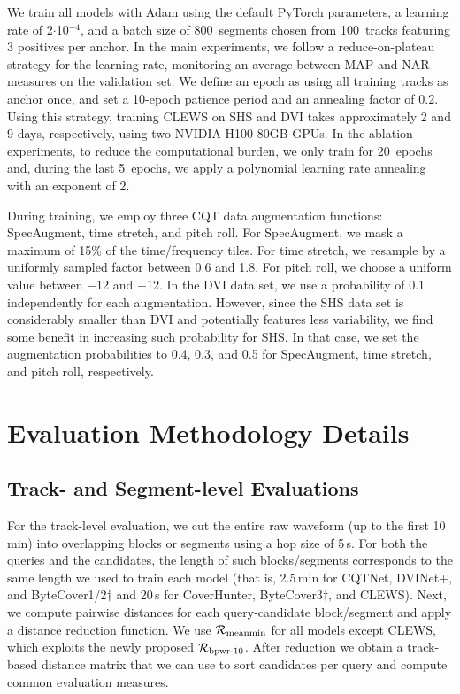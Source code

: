 We train all models with Adam using the default PyTorch parameters, a learning rate of 2$\cdot$10$^{-4}$, and a batch size of 800~segments chosen from 100~tracks featuring 3 positives per anchor. In the main experiments, we follow a reduce-on-plateau strategy for the learning rate, monitoring an average between MAP and NAR measures on the validation set. We define an epoch as using all training tracks as anchor once, and set a 10-epoch patience period and an annealing factor of 0.2. Using this strategy, training CLEWS on SHS and DVI takes approximately 2 and 9 days, respectively, using two NVIDIA H100-80GB GPUs. In the ablation experiments, to reduce the computational burden, we only train for 20~epochs and, during the last 5~epochs, we apply a polynomial learning rate annealing with an exponent of 2. 

During training, we employ three CQT data augmentation functions: SpecAugment, time stretch, and pitch roll. For SpecAugment, we mask a maximum of 15\% of the time/frequency tiles. For time stretch, we resample by a uniformly sampled factor between 0.6 and 1.8. For pitch roll, we choose a uniform value between $-$12 and $+$12. In the DVI data set, we use a probability of 0.1 independently for each augmentation. However, since the SHS data set is considerably smaller than DVI and potentially features less variability, we find some benefit in increasing such probability for SHS. In that case, we set the augmentation probabilities to 0.4, 0.3, and 0.5 for SpecAugment, time stretch, and pitch roll, respectively.



\section{Evaluation Methodology Details}
\label{sec:app_eval}


\subsection{Track- and Segment-level Evaluations}

For the track-level evaluation, we cut the entire raw waveform (up to the first 10\,min) into overlapping blocks or segments using a hop size of 5\,s. For both the queries and the candidates, the length of such blocks/segments corresponds to the same length we used to train each model (that is, 2.5\,min for CQTNet, DVINet+, and ByteCover1/2$\dag$ and 20\,s for CoverHunter, ByteCover3$\dag$, and CLEWS). Next, we compute pairwise distances for each query-candidate block/segment and apply a distance reduction function. We use $\mathcal{R}_{\text{meanmin}}$ for all models except CLEWS, which exploits the newly proposed $\mathcal{R}_{\text{bpwr-10}}$. After reduction we obtain a track-based distance matrix that we can use to sort candidates per query and compute common evaluation measures.

